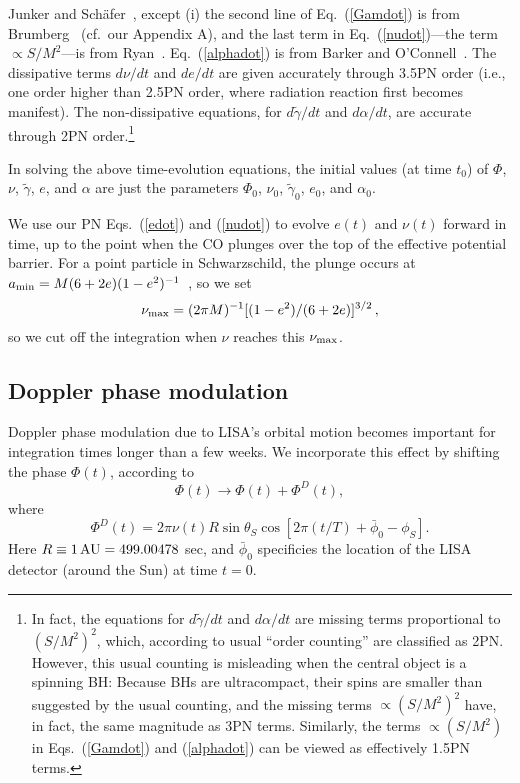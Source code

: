 \documentclass[11pt]{report}
\def\be{\begin{equation}}
\def\ee{\end{equation}}
\begin{document}
Junker and Sch\"afer~\cite{JunkerSchaefer}, except (i) the second line
of Eq.\ (\ref{Gamdot}) is from Brumberg~\cite{Brumberg}
(cf.\ our Appendix A),
and the last term in Eq.\ (\ref{nudot})---the term $\propto S/M^2$---is from
Ryan~\cite{ryan96}.  Eq.~(\ref{alphadot}) is from Barker and
O'Connell~\cite{Barker}.
The dissipative terms $d\nu/dt$ and
$de/dt$ are given accurately through 3.5PN order (i.e., one order higher
than 2.5PN order, where radiation reaction first becomes manifest).
The non-dissipative equations, for $d\tilde\gamma/dt$ and $d\alpha/dt$,
are accurate through 2PN order.\footnote{In fact, the equations for
$d\tilde\gamma/dt$ and $d\alpha/dt$ are missing terms proportional
to $(S/M^2)^2$, which, according to usual ``order counting'' are
classified as 2PN. However, this usual counting is misleading when
the central object is a spinning BH: Because BHs are ultracompact, their spins
are smaller than suggested by the usual counting, and the missing terms
$\propto (S/M^2)^2$ have, in fact, the same magnitude as 3PN terms.
Similarly, the terms  $\propto (S/M^2)$ in Eqs.~(\ref{Gamdot}) and
(\ref{alphadot}) can be viewed as effectively 1.5PN terms.}

In solving the above time-evolution equations, the initial values (at time
$t_0$) of $\Phi$, $\nu$, $\tilde\gamma$, $e$, and $\alpha$ are just the parameters
$\Phi_0$, $\nu_0$, $\tilde\gamma_0$, $e_0$, and $\alpha_0$.

We use our PN Eqs.~(\ref{edot}) and (\ref{nudot})
to evolve $e(t)$ and $\nu(t)$ forward in time, up
to the point when the CO plunges over the top of the
effective potential barrier. For a point particle in Schwarzschild, the
plunge occurs at
$a_{\rm min} = M (6 + 2e)(1-e^2)^{-1}$~\cite{Cutler-Kennefick-Poisson},
so we set
\be\label{numax}
\nu_{\rm max} = (2\pi M)^{-1}[(1-e^2)/(6 + 2e)]^{3/2} \, ,
\ee
so we cut off the integration when $\nu$ reaches this $\nu_{\rm max}$.


\subsection{Doppler phase modulation}

Doppler phase modulation
due to LISA's orbital motion becomes important
for integration times longer than a few weeks.
We incorporate this effect by shifting the phase
$\Phi(t)$, according to
\begin{equation}\label{phid1}
\Phi(t)\to \Phi(t)+\Phi^D(t),
\end{equation}
where
\begin{equation}\label{phid2}
\Phi^D(t)=2\pi \nu(t) R \sin\theta_S \cos[2\pi(t/T) + \bar\phi_0-\phi_S].
\end{equation}
Here $R \equiv 1\, {\rm AU} = 499.00478$ sec, and $\bar\phi_0$ specificies
the location of the LISA detector (around the Sun) at time $t=0$.
\end{document}
